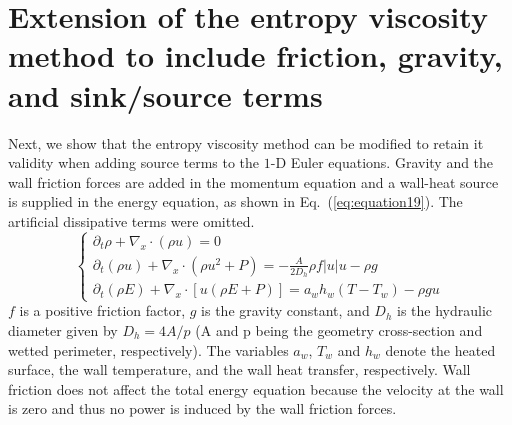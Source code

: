 \documentclass[12pt]{article}
\newcommand{\eqt}[1]{Eq.~(\ref{#1})} %
\begin{document}
%
\section{Extension of the entropy viscosity method to include friction, gravity, and sink/source terms}
\label{sec:ext}

Next, we show that the entropy viscosity method can be modified to retain it validity when adding source terms to the $1$-D Euler equations. Gravity and the wall friction forces are added in the momentum equation and a wall-heat source is supplied in the energy equation, as shown in \eqt{eq:equation19}. The artificial dissipative terms were omitted.
\begin{equation}
\label{eq:equation19}
\left\{
\begin{array}{lll}
\partial_t \rho + \nabla_x  \cdot \left( \rho u \right) = 0 \\
\partial_t \left( \rho u \right) + \nabla_x \cdot \left( \rho u^2 + P \right) =  - \frac{A}{2 D_h} \rho f |u| u - \rho g \\
\partial_t \left( \rho E \right) + \nabla_x \cdot \left[ u  \left( \rho E + P \right) \right] = a_w h_w \left( T - T_w \right) - \rho g u
\end{array}
\right.
\end{equation}
$f$ is a positive friction factor, $g$ is the gravity constant, and $D_h$ is the hydraulic diameter given by $D_h = 4A/p$ (A and p being the geometry cross-section and wetted perimeter, respectively). The variables $a_w$, $T_w$ and $h_w$ denote the heated surface, the wall temperature, and the wall heat transfer, respectively.
Wall friction does not affect the total energy equation because  the velocity at the wall is zero and thus no power is induced by the wall friction forces. 
\end{document}
